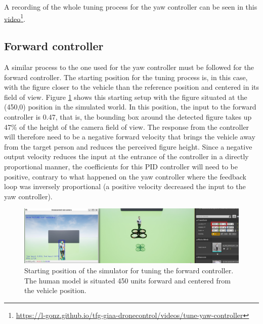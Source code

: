 A recording of the whole tuning process for the yaw controller can be seen in this \href{https://l-gonz.github.io/tfg-giaa-dronecontrol/videos/tune-yaw-controller}{video}\footnote{\url{https://l-gonz.github.io/tfg-giaa-dronecontrol/videos/tune-yaw-controller}}.


\subsection{Forward controller}


A similar process to the one used for the yaw controller must be followed for the forward controller.
The starting position for the tuning process is, in this case, with the figure closer to the vehicle than the reference position and centered in its field of view.
Figure \ref{fig:tune-ref-pos-fwd} shows this starting setup with the figure situated at the (450,0) position in the simulated world.
In this position, the input to the forward controller is 0.47, that is, the bounding box around the detected figure takes up 47\% of the height of the camera field of view.
The response from the controller will therefore need to be a negative forward velocity that brings the vehicle away from the target person and reduces the perceived figure height.
Since a negative output velocity reduces the input at the entrance of the controller in a directly proportional manner, the coefficients for this PID controller will need to be positive, contrary to what happened on the yaw controller where the feedback loop was inversely proportional (a positive velocity decreased the input to the yaw controller).


\begin{figure}
  \centering
  \includegraphics[width=\textwidth, keepaspectratio]{img/pid/tune-ref-pos-fwd.jpg}
  \caption{Starting position of the simulator for tuning the forward controller. The human model is situated 450 units forward and centered from the vehicle position.}\label{fig:tune-ref-pos-fwd}
\end{figure}

